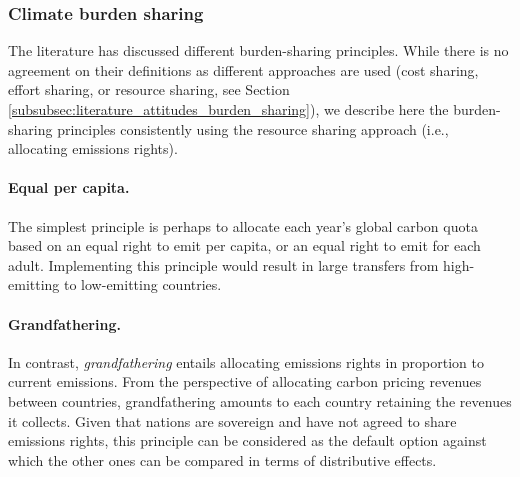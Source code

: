 
\subsubsection{Climate burden sharing}\label{subsubsec:literature_burden_sharing} 

The literature has discussed different burden-sharing principles. While there is no  agreement on their definitions as different approaches are used (cost sharing, effort sharing, or resource sharing, see Section \ref{subsubsec:literature_attitudes_burden_sharing}), we describe here the burden-sharing principles consistently using the resource sharing approach (i.e., allocating emissions rights). 

\paragraph{Equal per capita.} The simplest principle is perhaps to allocate each year's global carbon quota based on an equal right to emit per capita, or an equal right to emit for each adult. Implementing this principle would result in large transfers from high-emitting to low-emitting countries. 

\paragraph{Grandfathering.} In contrast, \textit{grandfathering} entails allocating emissions rights in proportion to current emissions. From the perspective of allocating carbon pricing revenues between countries, grandfathering amounts to each country retaining the revenues it collects. Given that nations are sovereign and have not agreed to share emissions rights, this principle can be considered as the default option against which the other ones can be compared in terms of distributive effects.

